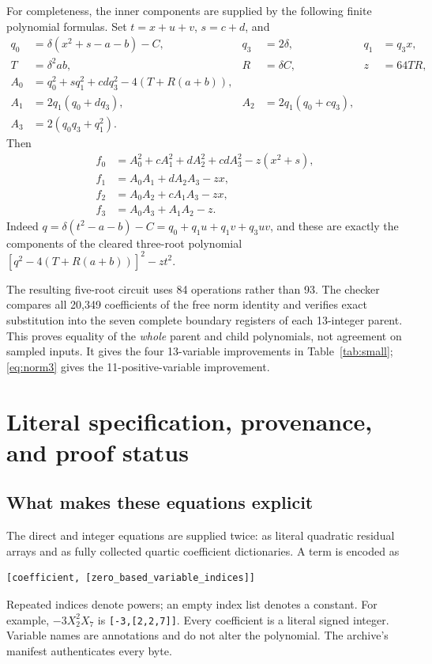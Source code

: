 \documentclass[11pt,letterpaper]{article}
\theoremstyle{definition}
\theoremstyle{remark}
\begin{document}
For completeness, the inner components are supplied by the following
finite polynomial formulas. Set $t=x+u+v$, $s=c+d$, and
\begin{align*}
 q_0&=\delta(x^2+s-a-b)-C,&q_3&=2\delta,&q_1&=q_3x,\\
 T&=\delta^2ab,&R&=\delta C,&z&=64TR,\\
 A_0&=q_0^2+s q_1^2+cd q_3^2-4(T+R(a+b)),\\
 A_1&=2q_1(q_0+dq_3),&A_2&=2q_1(q_0+cq_3),\\
 A_3&=2(q_0q_3+q_1^2).
\end{align*}
Then
\begin{align*}
 f_0&=A_0^2+cA_1^2+dA_2^2+cd A_3^2-z(x^2+s),\\
 f_1&=A_0A_1+dA_2A_3-zx,\\
 f_2&=A_0A_2+cA_1A_3-zx,\\
 f_3&=A_0A_3+A_1A_2-z.
\end{align*}
Indeed $q=\delta(t^2-a-b)-C=q_0+q_1u+q_1v+q_3uv$, and these
are exactly the components of the cleared three-root polynomial
$[q^2-4(T+R(a+b))]^2-zt^2$.

The resulting five-root circuit uses 84 operations rather than 93.
The checker compares all 20,349 coefficients of the free norm identity
and verifies exact substitution into the seven complete boundary
registers of each 13-integer parent. This proves equality of the
\emph{whole} parent and child polynomials, not agreement on sampled
inputs. It gives the four 13-variable improvements in
Table~\ref{tab:small}; \eqref{eq:norm3} gives the 11-positive-variable
improvement.

\section{Literal specification, provenance, and proof status}
\label{sec:artifacts}

\subsection{What makes these equations explicit}

The direct and integer equations are supplied twice: as literal
quadratic residual arrays and as fully collected quartic coefficient
dictionaries. A term is encoded as
\begin{lstlisting}
[coefficient, [zero_based_variable_indices]]
\end{lstlisting}
Repeated indices denote powers; an empty index list denotes a constant.
For example, $-3X_2^2X_7$ is \texttt{[-3,[2,2,7]]}. Every coefficient
is a literal signed integer. Variable names are annotations and do not
alter the polynomial. The archive's manifest authenticates every byte.
\end{document}
